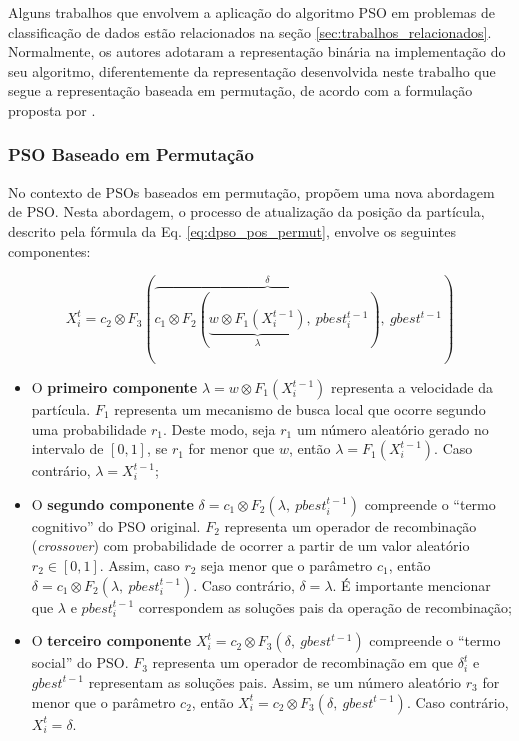 \documentclass[
	12pt,				%
	openany,			%
	oneside,	
	a4paper,			%
	brazil,				%
	]{unimontes-ppgmsc-abntex2}
\begin{document}
Alguns trabalhos que envolvem a aplicação do algoritmo PSO em problemas de classificação de dados estão relacionados na seção \ref{sec:trabalhos_relacionados}. Normalmente, os autores adotaram a representação binária na implementação do seu algoritmo, diferentemente da representação desenvolvida neste trabalho que segue a representação baseada em permutação, de acordo com a formulação proposta por .

\subsubsection{PSO Baseado em Permutação}
\label{sec:atual_part}

No contexto de PSOs baseados em permutação,  propõem uma nova abordagem de PSO. Nesta abordagem, o processo de atualização da posição da partícula, descrito pela fórmula da Eq. \ref{eq:dpso_pos_permut}, envolve os seguintes componentes: 

\begin{equation}
\label{eq:dpso_pos_permut}
X^{t}_{i} = c_2 \otimes F_3 (\overbrace{c_1 \otimes F_2 (\underbrace{w \otimes F_1 (X^{t-1}_{i})}_{\lambda},\ pbest^{t-1}_{i})}^{\delta},\ 
gbest^{t-1})
\end{equation}

\begin{itemize}
\item O \textbf{primeiro componente} $\lambda = w \otimes F_1(X^{t-1}_{i})$ representa a velocidade da partícula. $F_1$ representa um mecanismo de busca local que ocorre segundo uma probabilidade $r_1$. Deste modo, seja $r_1$ um número aleatório gerado no intervalo de $[0,1]$, se $r_1$ for menor que $w$, então $\lambda  = F_1(X^{t-1}_{i})$. Caso contrário, $\lambda = X^{t-1}_{i}$; 

\item O \textbf{segundo componente} $\delta = c_1 \otimes  F_2(\lambda,\ pbest^{t-1}_{i})$ compreende o ``termo cognitivo'' do PSO original. $F_2$ representa um operador de recombinação ({\em crossover}) com probabilidade de ocorrer a partir de um valor aleatório $r_2 \in [0,1]$. Assim, caso $r_2$ seja menor que o parâmetro $c_1$, então $\delta = c_1 \otimes  F_2(\lambda,\ pbest^{t-1}_{i})$. Caso contrário, $\delta = \lambda$. É importante mencionar que $\lambda$ e $pbest^{t-1}_{i}$ correspondem as soluções pais da operação de recombinação; 

\item O \textbf{terceiro componente} $X^{t}_{i} = c_2 \otimes F_3 (\delta,\ gbest ^{t-1})$ compreende o ``termo social'' do PSO. $F_3$ representa um operador de recombinação em que $\delta ^{t}_{i}$ e $gbest^{t-1}$ representam as soluções pais. Assim, se um número aleatório $r_3$ for menor que o parâmetro $c_2$, então $X^{t}_{i} = c_2 \otimes F_3 (\delta,\ gbest ^{t-1})$. Caso contrário, $X^{t}_{i} = \delta$.
\end{itemize}
\end{document}
